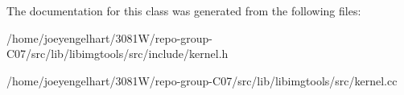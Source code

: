 The documentation for this class was generated from the following files\+:\begin{DoxyCompactItemize}
\item 
/home/joeyengelhart/3081\+W/repo-\/group-\/\+C07/src/lib/libimgtools/src/include/kernel.\+h\item 
/home/joeyengelhart/3081\+W/repo-\/group-\/\+C07/src/lib/libimgtools/src/kernel.\+cc\end{DoxyCompactItemize}
